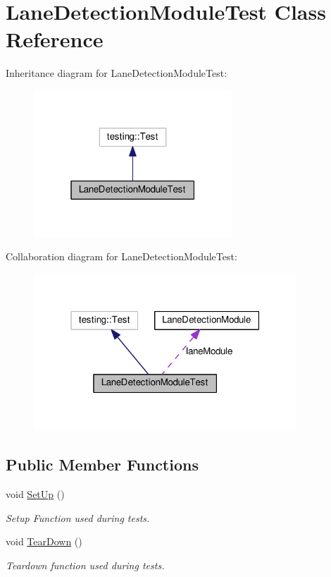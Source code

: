 \hypertarget{classLaneDetectionModuleTest}{}\section{Lane\+Detection\+Module\+Test Class Reference}
\label{classLaneDetectionModuleTest}


Inheritance diagram for Lane\+Detection\+Module\+Test\+:
\nopagebreak
\begin{figure}[H]
\begin{center}
\leavevmode
\includegraphics[width=211pt]{classLaneDetectionModuleTest__inherit__graph}
\end{center}
\end{figure}


Collaboration diagram for Lane\+Detection\+Module\+Test\+:
\nopagebreak
\begin{figure}[H]
\begin{center}
\leavevmode
\includegraphics[width=280pt]{classLaneDetectionModuleTest__coll__graph}
\end{center}
\end{figure}
\subsection*{Public Member Functions}
\begin{DoxyCompactItemize}
\item 
void \hyperlink{classLaneDetectionModuleTest_ab5942663756c8d5aa042f605c23fb7c9}{Set\+Up} ()
\begin{DoxyCompactList}\small\item\em Setup Function used during tests. \end{DoxyCompactList}\item 
void \hyperlink{classLaneDetectionModuleTest_ae67e6d029fe74bbc9f762045a47b85e3}{Tear\+Down} ()
\begin{DoxyCompactList}\small\item\em Teardown function used during tests. \end{DoxyCompactList}\end{DoxyCompactItemize}
